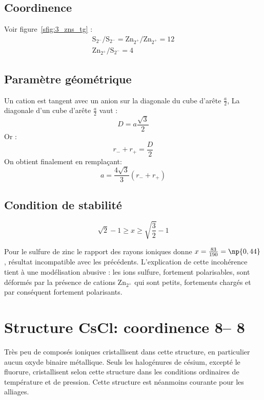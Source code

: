 \subsection{Coordinence}
Voir figure~\ref{sfig:3_zns_tg} :\\
\begin{gather}
    \text{S}_{2^-}/\text{S}_{2^-} = \text{Zn}_{2^+}/\text{Zn}_{2^+} = 12\\
    \text{Zn}_{2^+}/\text{S}_{2^-} = 4
\end{gather}


\subsection{Paramètre géométrique}
Un cation est tangent avec un anion sur la diagonale du cube d'arête $\frac{a}{2}$,
La diagonale d'un cube d'arête $\frac{a}{2}$ vaut :
\begin{equation}
    D = a\frac{\sqrt{3}}{2}
\end{equation}
Or :
\begin{equation}
    r_- + r_+ = \frac{D}{2}
\end{equation}
On obtient finalement en remplaçant:
\begin{equation}
    \boxed{a = \frac{4\sqrt{3}}{3}(r_- + r_+)}
    \label{eq:3_zns_ar+r-}
\end{equation}


\subsection{Condition de stabilité}
\begin{equation}
    \sqrt{2} - 1 \geq x \geq \sqrt{\frac{3}{2}} - 1
    \label{eq:3_zns_stab}
\end{equation}
\begin{rem}
    Pour le sulfure de zinc le rapport des rayons ioniques donne
    $x = \frac{83}{190} = \np{0,44}$, résultat incompatible avec les précédents.
    L'explication de cette incohérence tient à une
    modélisation abusive : les ions sulfure, fortement polarisables, sont déformés 
    par la présence de cations Zn$_{2^+}$ qui sont petits, fortements chargés et 
    par conséquent fortement polarisants.
\end{rem}



\section{Structure CsCl: coordinence 8\--- 8}
Très peu de composés ioniques cristallisent dans cette structure, en particulier 
aucun oxyde binaire métallique. Seuls les halogénures de césium, excepté le fluorure,
cristallisent selon cette structure dans les conditions ordinaires de température et de
pression. Cette structure est néanmoins courante pour les alliages.


